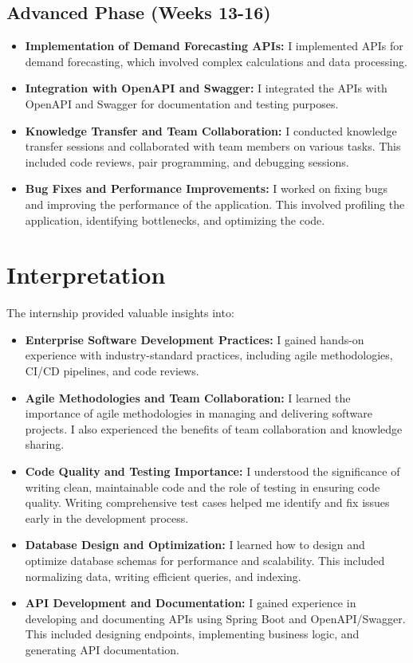 \documentclass[openany, 11pt]{report} %
\begin{document}
\section{Advanced Phase (Weeks 13-16)}
\begin{itemize}
    \item \textbf{Implementation of Demand Forecasting APIs:} I implemented APIs for demand forecasting, which involved complex calculations and data processing.
    \item \textbf{Integration with OpenAPI and Swagger:} I integrated the APIs with OpenAPI and Swagger for documentation and testing purposes.
    \item \textbf{Knowledge Transfer and Team Collaboration:} I conducted knowledge transfer sessions and collaborated with team members on various tasks. This included code reviews, pair programming, and debugging sessions.
    \item \textbf{Bug Fixes and Performance Improvements:} I worked on fixing bugs and improving the performance of the application. This involved profiling the application, identifying bottlenecks, and optimizing the code.
\end{itemize}

\chapter{Interpretation}
The internship provided valuable insights into:
\begin{itemize}
    \item \textbf{Enterprise Software Development Practices:} I gained hands-on experience with industry-standard practices, including agile methodologies, CI/CD pipelines, and code reviews.
    \item \textbf{Agile Methodologies and Team Collaboration:} I learned the importance of agile methodologies in managing and delivering software projects. I also experienced the benefits of team collaboration and knowledge sharing.
    \item \textbf{Code Quality and Testing Importance:} I understood the significance of writing clean, maintainable code and the role of testing in ensuring code quality. Writing comprehensive test cases helped me identify and fix issues early in the development process.
    \item \textbf{Database Design and Optimization:} I learned how to design and optimize database schemas for performance and scalability. This included normalizing data, writing efficient queries, and indexing.
    \item \textbf{API Development and Documentation:} I gained experience in developing and documenting APIs using Spring Boot and OpenAPI/Swagger. This included designing endpoints, implementing business logic, and generating API documentation.
\end{itemize}
\end{document}
